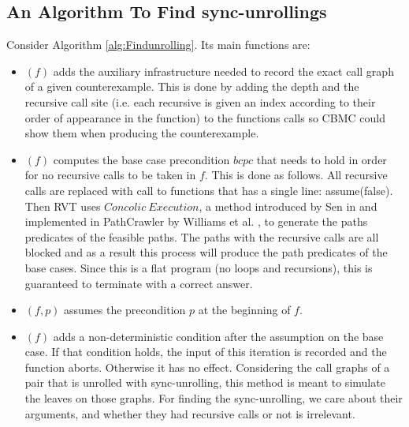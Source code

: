 \subsection{An Algorithm To Find sync-unrollings} \label{sec:findsyncunrolling}
Consider Algorithm \ref{alg:Findunrolling}. Its main functions are: 
\begin{itemize}
    \item {}$(f)$ adds the auxiliary infrastructure needed to record the exact call graph of a given counterexample. This is done by adding the depth and the recursive call site (i.e. each recursive is given an index according to their order of appearance in the function) to the functions calls so CBMC could show them when producing the counterexample.
    \item {}$(f)$ computes the base case precondition $bcpc$ that needs to hold in order for no recursive calls to be taken in $f$. This is done as follows. All recursive calls are replaced with call to  functions that has a single line: assume(false). Then RVT uses $Concolic\ Execution$, a method introduced by Sen in \cite{10.1145/1321631.1321746} and implemented in PathCrawler  by Williams et al. \cite{10.1007/11408901_21}, to generate the paths predicates of the feasible paths. The paths with the recursive calls are all blocked and as a result this process will produce the path predicates of the base cases. Since this is a flat program (no loops and recursions), this is guaranteed to terminate with a correct answer.
    \item {}$(f,p)$ assumes the precondition $p$ at the beginning of $f$. 
    \item {}$(f)$ adds a non-deterministic condition after the assumption on the base case. If that condition holds, the input of this iteration is recorded and the function aborts. Otherwise it has no effect. Considering the call graphs of a pair that is unrolled with sync-unrolling, this method is meant to simulate the leaves on those graphs. For finding the sync-unrolling, we care about their arguments, and whether they had recursive calls or not is irrelevant. 

\end{itemize}
